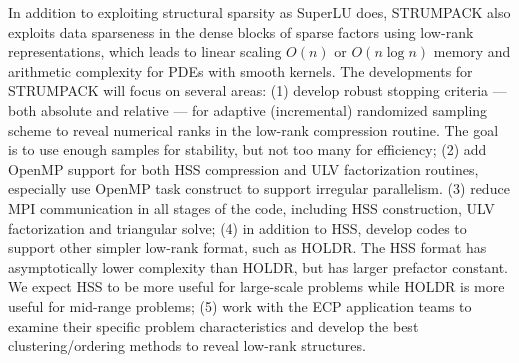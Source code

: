 In addition to exploiting structural sparsity as SuperLU does, STRUMPACK
also exploits data sparseness in the dense blocks of sparse factors using
low-rank representations, which leads to linear scaling $O(n)$ or $O(n \log n)$
memory and arithmetic complexity for PDEs with smooth kernels.
The developments for STRUMPACK will focus on several areas:
(1) develop robust stopping criteria --- both absolute and relative --- for
    adaptive (incremental) randomized sampling scheme to reveal numerical
    ranks in the low-rank compression routine. The goal is to use
    enough samples for stability, but not too many for efficiency;
(2) add OpenMP support for both HSS compression and ULV factorization routines,
    especially use OpenMP task construct to support irregular parallelism.
(3) reduce MPI communication in all stages of the code, including HSS
    construction, ULV factorization and triangular solve;
(4) in addition to HSS, develop codes to support other simpler low-rank
    format, such as HOLDR. The HSS format has asymptotically lower complexity
    than HOLDR, but has larger prefactor constant. We expect HSS to be more
    useful for large-scale problems while HOLDR is more useful for mid-range
    problems;
(5) work with the ECP application teams to examine their specific problem
    characteristics and develop the best clustering/ordering methods to 
    reveal low-rank structures.

